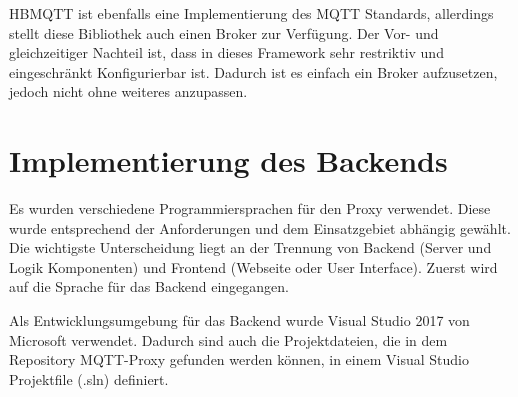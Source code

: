     HBMQTT ist ebenfalls eine Implementierung des \ac{MQTT} Standards, allerdings stellt diese Bibliothek auch einen Broker zur Verfügung. Der Vor- und gleichzeitiger Nachteil ist, dass in dieses Framework sehr restriktiv und eingeschränkt Konfigurierbar ist. Dadurch ist es einfach ein Broker aufzusetzen, jedoch nicht ohne weiteres anzupassen.
    \cite{jouanin_2018}
    
\section{Implementierung des Backends}

    Es wurden verschiedene Programmiersprachen für den Proxy verwendet. Diese wurde entsprechend der Anforderungen und dem Einsatzgebiet abhängig gewählt.
    Die wichtigste Unterscheidung liegt an der Trennung von Backend (Server und Logik Komponenten) und Frontend (Webseite oder User Interface).
    Zuerst wird auf die Sprache für das Backend eingegangen.
    
    Als Entwicklungsumgebung für das Backend wurde Visual Studio 2017 \cite{microsoft_2019} von Microsoft verwendet. Dadurch sind auch die Projektdateien, die in dem Repository \glqq MQTT-Proxy\grqq{} \cite{eisenschmidt_2019} gefunden werden können, in einem Visual Studio Projektfile (.sln) definiert.
    
